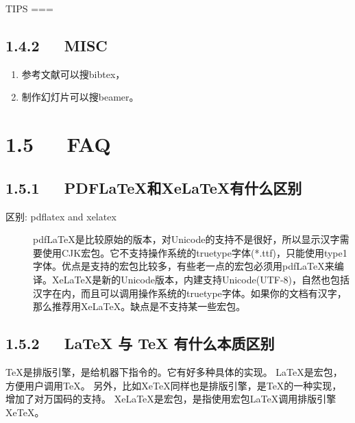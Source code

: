 \documentclass[letterpaper,12pt,english]{sphinxmanual}
\begin{document}
TIPS
===


\subsection{1.4.2   MISC}
\label{\detokenize{001software/001install/LaTex:misc}}\begin{enumerate}
%
\item {} 
参考文献可以搜bibtex，

\item {} 
制作幻灯片可以搜beamer。

\end{enumerate}


\section{1.5   FAQ}
\label{\detokenize{001software/001install/LaTex:faq}}

\subsection{1.5.1   PDFLaTeX和XeLaTeX有什么区别}
\label{\detokenize{001software/001install/LaTex:pdflatexxelatex}}\begin{description}
\item[{区别: pdflatex and xelatex}] \leavevmode
pdfLaTeX是比较原始的版本，对Unicode的支持不是很好，所以显示汉字需要使用CJK宏包。它不支持操作系统的truetype字体(*.ttf)，只能使用type1字体。优点是支持的宏包比较多，有些老一点的宏包必须用pdfLaTeX来编译。XeLaTeX是新的Unicode版本，内建支持Unicode(UTF-8)，自然也包括汉字在内，而且可以调用操作系统的truetype字体。如果你的文档有汉字，那么推荐用XeLaTeX。缺点是不支持某一些宏包。

\end{description}


\subsection{1.5.2   LaTeX 与 TeX 有什么本质区别}
\label{\detokenize{001software/001install/LaTex:latex-tex}}
TeX是排版引擎，是给机器下指令的。它有好多种具体的实现。
LaTeX是宏包，方便用户调用TeX。
另外，比如XeTeX同样也是排版引擎，是TeX的一种实现，增加了对万国码的支持。
XeLaTeX是宏包，是指使用宏包LaTeX调用排版引擎XeTeX。
\end{document}
